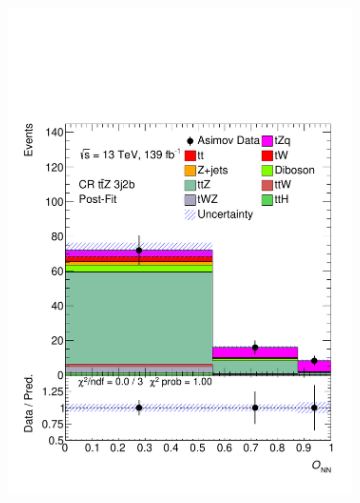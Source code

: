\begin{figure}[!h]
\begin{subfigure}[b]{0.33\linewidth}
    \includegraphics[width=\textwidth]{ubonn-thesis/Chapters/Chapters_07/Figure/Asmiov/CR_3j2b_postFit.pdf} 
  \end{subfigure} 
  \newline
  \begin{subfigure}[b]{0.33\linewidth}
    \centering

\end{subfigure}
\end{figure}
